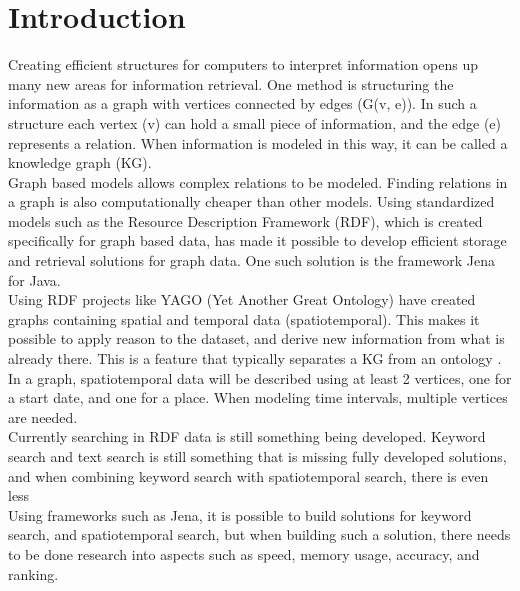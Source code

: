 
\chapter{Introduction}
Creating efficient structures for computers to interpret information opens up many new areas for information retrieval. One method is structuring the information as a graph with vertices connected by edges (G(v, e)). In such a structure each vertex (v) can hold a small piece of information, and the edge (e) represents a relation. When information is modeled in this way, it can be called a knowledge graph (KG).\\

Graph based models allows complex relations to be modeled. Finding relations in a graph is also computationally cheaper than other models. Using standardized models such as the Resource Description Framework (RDF), which is created specifically for graph based data, has made it possible to develop efficient storage and retrieval solutions for graph data. One such solution is the framework Jena \cite{jena2} for Java.\\

Using RDF projects like YAGO (Yet Another Great Ontology) \cite{yago} have created graphs containing spatial and temporal data (spatiotemporal). This makes it possible to apply reason to the dataset, and derive new information from what is already there. This is a feature that typically separates a KG from an ontology \cite{KGDefYago}. In a graph, spatiotemporal data will be described using at least 2 vertices, one for a start date, and one for a place. When modeling time intervals, multiple vertices are needed.\\

Currently searching in RDF data is still something being developed. Keyword search and text search is still something that is missing fully developed solutions, and when combining keyword search with spatiotemporal search, there is even less %
\\
Using frameworks such as Jena, it is possible to build solutions for keyword search, and spatiotemporal search, but when building such a solution, there needs to be done research into aspects such as speed, memory usage, accuracy, and ranking.\\


